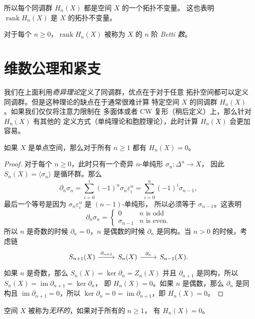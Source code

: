 \documentclass[fontset=none]{Notes}
\DeclareMathOperator\im{im}
\DeclareMathOperator\rank{rank}
\begin{document}
所以每个同调群 $H_n(X)$ 都是空间 $X$ 的一个拓扑不变量。
这也表明 $\rank H_n(X)$ 是 $X$ 的拓扑不变量。

\begin{definition}
  对于每个 $n\geq 0$，$\rank H_n(X)$ 被称为 $X$ 的 $n$ 
  阶 \emph{Betti 数}。
\end{definition}

\section{维数公理和紧支}

我们在上面利用\emph{奇异理论}定义了同调群，优点在于对于任意
拓扑空间都可以定义同调群。但是这种理论的缺点在于通常很难计算
特定空间 $X$ 的同调群 $H_n(X)$。如果我们仅仅将注意力限制在
多面体或者 CW 复形（稍后定义）上，那么针对 $H_n(X)$ 有其他的
定义方式（单纯理论和胞腔理论），此时计算 $H_n(X)$ 会更加容易。

\begin{theorem}[维数公理]
  如果 $X$ 是单点空间，那么对于所有 $n\geq 1$ 都有 $H_n(X)=0$。
\end{theorem}
\begin{proof}
  对于每个 $n\geq 0$，此时只有一个奇异 $n$-单纯形 $\sigma_n:\Delta^n\to X$，
  因此 $S_n(X)=\langle \sigma_n\rangle$ 是循环群。那么
  \[
    \partial_n\sigma_n=\sum_{i=0}^i(-1)^n\sigma_n\varepsilon_i^n
    =\sum_{i=0}^n (-1)^i \sigma_{n-1},
  \]
  最后一个等号是因为 $\sigma_n\varepsilon_i^n$ 是 $(n-1)$-单纯形，
  所以必须等于 $\sigma_{n-1}$。这表明 
  \[
    \partial_n\sigma_n=\begin{cases}
      0 & \text{$n$ is odd}\\
      \sigma_{n-1} & \text{$n$ is even}.
    \end{cases}
  \]
  所以 $n$ 是奇数的时候 $\partial_n=0$，$n$ 是偶数的时候 $\partial_n$
  是同构。当 $n>0$ 的时候，考虑链
  \[
    \begin{tikzcd}
      S_{n+1}(X)\arrow[r,"\partial_{n+1}"] & S_n(X)
      \arrow[r,"\partial_n"] & S_{n-1}(X).
    \end{tikzcd}
  \]
  如果 $n$ 是奇数，那么 $S_n(X)=\ker\partial_n=Z_n(X)$
  并且 $\partial_{n+1}$ 是同构，所以 $S_n(X)=\im\partial_{n+1}=\ker\partial_n$，
  即 $H_n(X)=0$。如果 $n$ 是偶数，那么 $\partial_n$ 是同构且
  $\im\partial_{n+1}=0$，所以 $\ker\partial_n=0=\im\partial_{n+1}$，即
  $H_n(X)=0$。
\end{proof}

\begin{definition}
  空间 $X$ 被称为\emph{无环的}，如果对于所有的 $n\ge 1$，
  有 $H_n(X)=0$。
\end{definition}
\end{document}
